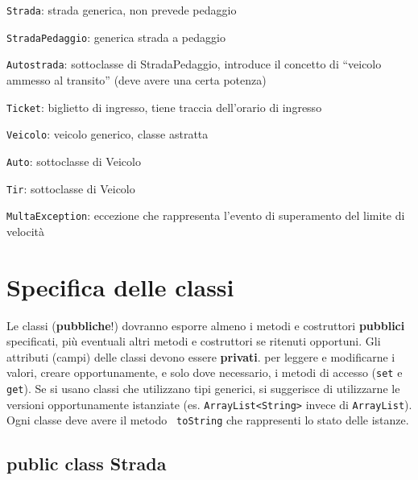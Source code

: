 \documentclass[a4paper]{article}
\begin{document}
\begin{compactenum}
\item \texttt{Strada}: strada generica, non prevede pedaggio
\item \texttt{StradaPedaggio}: generica strada a pedaggio
\item \texttt{Autostrada}: sottoclasse di StradaPedaggio, introduce il concetto 
di ``veicolo ammesso al transito'' (deve avere una certa potenza)
\item \texttt{Ticket}: biglietto di ingresso, tiene traccia dell'orario di 
ingresso

\item \texttt{Veicolo}: veicolo generico, classe astratta
\item \texttt{Auto}: sottoclasse di Veicolo
\item \texttt{Tir}: sottoclasse di Veicolo

\item \texttt{MultaException}: eccezione che rappresenta l'evento di 
superamento del limite di velocità


\end{compactenum}

\section*{Specifica delle classi}

Le classi (\textbf{pubbliche}!) dovranno esporre almeno i metodi e costruttori \textbf{pubblici} specificati, più eventuali altri metodi e costruttori %
se ritenuti opportuni.
Gli attributi (campi) delle classi devono essere \textbf{privati}.
per leggere e modificarne i valori, 
creare opportunamente, e solo dove necessario, i metodi di accesso ({\tt set} e 
{\tt get}).
Se si usano classi che utilizzano tipi generici, si suggerisce  di utilizzarne 
le versioni opportunamente istanziate (es. \texttt{ArrayList<String>} invece di
\texttt{ArrayList}).
Ogni classe deve avere il metodo {\tt 
toString} che rappresenti lo stato delle istanze. 


\subsection*{public class Strada}
\end{document}

